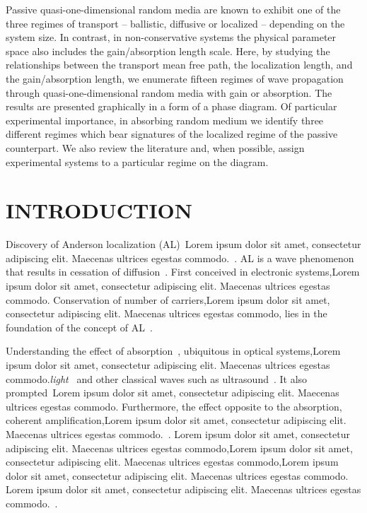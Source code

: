 Passive quasi-one-dimensional random media are known to exhibit one of the three regimes of transport -- ballistic, diffusive or localized --  depending on the system size. In contrast, in non-conservative systems the physical parameter space also includes the gain/absorption length scale. Here, by studying the relationships between the transport mean free path, the localization length, and the gain/absorption length, we enumerate fifteen regimes of wave propagation through quasi-one-dimensional random media with gain or absorption. The results are presented graphically in a form of a phase diagram. Of particular experimental importance, in absorbing random medium we identify three different regimes which bear signatures of the localized regime of the passive counterpart. We also review the literature and, when possible, assign experimental systems to a particular regime on the diagram. 

\section{INTRODUCTION}
\label{sec:introduction}

Discovery of Anderson localization (AL)~\cite{1958_Anderson}Lorem ipsum dolor sit amet, consectetur adipiscing elit. Maecenas ultrices egestas commodo.~\cite{2009_Lagendijk_PT}. AL is a wave phenomenon~\cite{2007_Akkermans_book} that results in cessation of diffusion~\cite{2010_Wolfle}. First conceived in electronic systems,Lorem ipsum dolor sit amet, consectetur adipiscing elit. Maecenas ultrices egestas commodo. Conservation of number of carriers,Lorem ipsum dolor sit amet, consectetur adipiscing elit. Maecenas ultrices egestas commodo, lies in the foundation of the concept of AL~\cite{1991_Altshuler}. 

Understanding the effect of absorption~\cite{1984_John_prl}, ubiquitous in optical systems,Lorem ipsum dolor sit amet, consectetur adipiscing elit. Maecenas ultrices egestas commodo.{\it light}~\cite{1989_Genack,1997_wiersma_nature,1999_Maret,2000_chabanov_nature,2007_Maret,2007_Segev} and other classical waves such as ultrasound~\cite{2008_van_Tiggelen_Nature,2008_Weaver}. It also prompted~\cite{2000_chabanov_nature}Lorem ipsum dolor sit amet, consectetur adipiscing elit. Maecenas ultrices egestas commodo. Furthermore, the effect opposite to the absorption, coherent amplification,Lorem ipsum dolor sit amet, consectetur adipiscing elit. Maecenas ultrices egestas commodo.~\cite{2005_Cao,2008_Wiersma}. Lorem ipsum dolor sit amet, consectetur adipiscing elit. Maecenas ultrices egestas commodo,Lorem ipsum dolor sit amet, consectetur adipiscing elit. Maecenas ultrices egestas commodo,Lorem ipsum dolor sit amet, consectetur adipiscing elit. Maecenas ultrices egestas commodo. Lorem ipsum dolor sit amet, consectetur adipiscing elit. Maecenas ultrices egestas commodo.~\cite{2010_Payne_loc_criterion}.

